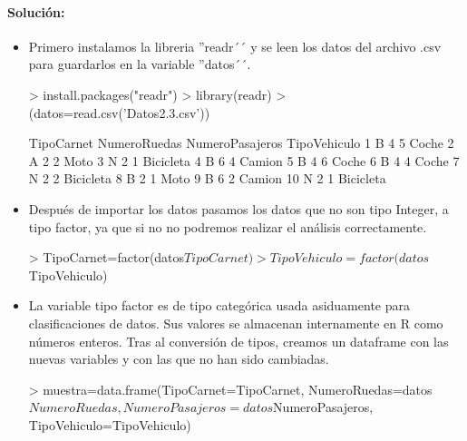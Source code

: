 \documentclass[a4paper, 12pt]{article}
\begin{document}
	\paragraph{Solución:}
	\begin{itemize}
		\item Primero instalamos la libreria ''readr´´ y se leen los datos del archivo .csv para guardarlos en la variable ''datos´´.
\begin{Schunk}
\begin{Sinput}
> install.packages("readr")
> library(readr)
> (datos=read.csv('Datos2.3.csv'))
\end{Sinput}
\begin{Soutput}
   TipoCarnet NumeroRuedas NumeroPasajeros TipoVehiculo
1           B            4               5        Coche
2           A            2               2         Moto
3           N            2               1    Bicicleta
4           B            6               4       Camion
5           B            4               6        Coche
6           B            4               4        Coche
7           N            2               2    Bicicleta
8           B            2               1         Moto
9           B            6               2       Camion
10          N            2               1    Bicicleta
\end{Soutput}
\end{Schunk}
		\item Después de importar los datos pasamos los datos que no son tipo Integer, a tipo factor, ya que si no no podremos realizar el análisis correctamente.
\begin{Schunk}
\begin{Sinput}
> TipoCarnet=factor(datos$TipoCarnet)
> TipoVehiculo=factor(datos$TipoVehiculo)
\end{Sinput}
\end{Schunk}
		\item La variable tipo factor es de tipo categórica usada asiduamente para clasificaciones de datos. Sus valores se almacenan internamente en R como números enteros. Tras al conversión de tipos, creamos un dataframe con las nuevas variables y con las que no han sido cambiadas.
\begin{Schunk}
\begin{Sinput}
> muestra=data.frame(TipoCarnet=TipoCarnet, NumeroRuedas=datos$NumeroRuedas, NumeroPasajeros=datos$NumeroPasajeros, TipoVehiculo=TipoVehiculo)
\end{Sinput}
\end{Schunk}

\end{itemize}
\end{document}
